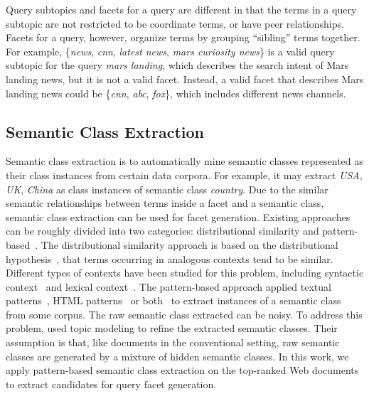 Query subtopics and facets for a query are different in that the terms in a query subtopic are not restricted to be coordinate terms, or have peer relationships. Facets for a query, however, organize terms by grouping ``sibling'' terms together. For example, \{\textit{news}, \textit{cnn}, \textit{latest news}, \textit{mars curiosity news}\} is a valid query subtopic for the query \textit{mars landing}, which describes the search intent of Mars landing news, but it is not a valid facet. Instead, a valid facet that describes Mars landing news could be \{\textit{cnn}, \textit{abc}, \textit{fox}\}, which includes different news channels.

\subsection{Semantic Class Extraction}
Semantic class extraction is to automatically mine semantic classes represented as their class instances from certain data corpora. For example, it may extract \textit{USA}, \textit{UK}, \textit{China} as class instances of semantic class \textit{country}. Due to the similar semantic relationships between terms inside a facet and a semantic class, semantic class extraction can be used for facet generation. Existing approaches can be roughly divided into two categories: distributional similarity and pattern-based~\cite{shi2010corpus}. The distributional similarity approach is based on the distributional hypothesis~\cite{Harris}, that terms occurring in analogous contexts tend to be similar. Different types of contexts have been studied for this problem, including syntactic context~\cite{pantel2002discovering} and lexical context~\cite{pantel2004towards,agirre2009study,pantel2009web}.
The pattern-based approach applied textual patterns~\cite{hearst1992automatic,pasca2004acquisition}, HTML patterns~\cite{shinzato2007simple} or both~\cite{zhang2009employing,shi2010corpus} to extract instances of a semantic class from some corpus.
The raw semantic class extracted can be noisy. To address this problem, \citet{zhang2009employing} used topic modeling to refine the extracted semantic classes.
Their assumption is that, like documents in the conventional setting, raw semantic classes are generated by a mixture of hidden semantic classes.
In this work, we apply pattern-based semantic class extraction on the top-ranked Web documents to extract candidates for query facet generation.

